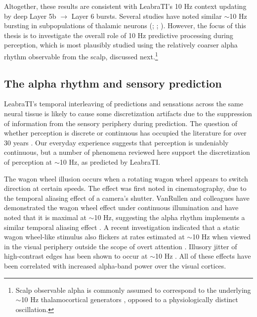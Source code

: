 \documentclass[dwyatte_dissertation.tex]{subfiles}
\begin{document}
Altogether, these results are consistent with LeabraTI's 10 Hz context updating by deep Layer 5b $\rightarrow$ Layer 6 bursts. Several studies have noted similar $\sim$10 Hz bursting in subpopulations of thalamic neurons (; ; ). However, the focus of this thesis is to investigate the overall role of 10 Hz predictive processing during perception, which is most plausibly studied using the relatively coarser alpha rhythm observable from the scalp, discussed next.\footnote{Scalp observable alpha is commonly assumed to correspond to the underlying $\sim$10 Hz thalamocortical generators \cite{LopesdaSilva91,KlimeschSausengHanslmayr07,PalvaPalva07,LorinczKekesiJuhaszEtAl09,BollimuntaMoSchroederEtAl11,HanslmayrGrossKlimeschEtAl11}, opposed to a physiologically distinct oscillation.}

\subsection{The alpha rhythm and sensory prediction}
LeabraTI's temporal interleaving of predictions and sensations across the same neural tissue is likely to cause some discretization artifacts due to the suppression of information from the sensory periphery during prediction. The question of whether perception is discrete or continuous has occupied the literature for over 30 years \cite[see][for a review]{VanRullenKoch03b}. Our everyday experience suggests that perception is undeniably continuous, but a number of phenomena reviewed here support the discretization of perception at $\sim$10 Hz, as predicted by LeabraTI.

The wagon wheel illusion occurs when a rotating wagon wheel appears to switch direction at certain speeds. The effect was first noted in cinematography, due to the temporal aliasing effect of a camera's shutter. VanRullen and colleagues have demonstrated the wagon wheel effect under continuous illumination and have noted that it is maximal at $\sim$10 Hz, suggesting the alpha rhythm implements a similar temporal aliasing effect \cite{VanRullenReddyKoch05,VanRullenReddyKoch06}. A recent investigation indicated that a static wagon wheel-like stimulus also flickers at rates estimated at $\sim$10 Hz when viewed in the visual periphery outside the scope of overt attention \cite{SokoliukVanRullen13}. Illusory jitter of high-contrast edges has been shown to occur at $\sim$10 Hz \cite{AmanoArnoldTakedaEtAl08}. All of these effects have been correlated with increased alpha-band power over the visual cortices.
\end{document}
